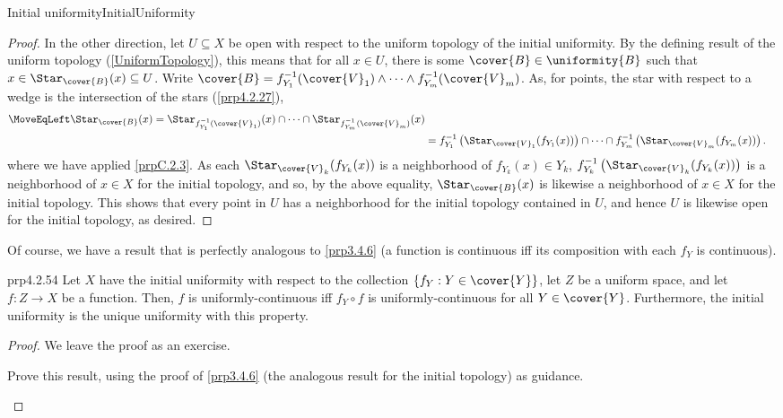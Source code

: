 \begin{prp}{Initial uniformity}{InitialUniformity}
\begin{proof}
In the other direction, let $U\subseteq X$ be open with respect to the uniform topology of the initial uniformity.  By the defining result of the uniform topology (\cref{UniformTopology}), this means that for all $x\in U$, there is some $\cover{B}\in \uniformity{B}$ such that $x\in \Star _{\cover{B}}(x)\subseteq U$.  Write $\cover{B}=f_{Y_1}^{-1}(\cover{V}_1)\wedge \cdots \wedge f_{Y_m}^{-1}(\cover{V}_m)$.  As, for points, the star with respect to a wedge is the intersection of the stars (\cref{prp4.2.27}),
{\small
\begin{equation*}
\begin{split}
\MoveEqLeft
\Star _{\cover{B}}(x)=\Star _{f_{Y_1}^{-1}(\cover{V}_1)}(x)\cap \cdots \cap \Star _{f_{Y_m}^{-1}(\cover{V}_m)}(x) \\
& =f_{Y_1}^{-1}\left( \Star _{\cover{V}_1}(f_{Y_1}(x))\right) \cap \cdots \cap f_{Y_m}^{-1}\left( \Star _{\cover{V}_m}(f_{Y_m}(x))\right) .
\end{split}
\end{equation*}
}
where we have applied \cref{prpC.2.3}.  As each $\Star _{\cover{V}_k}(f_{Y_k}(x))$ is a neighborhood of $f_{Y_k}(x)\in Y_k$, $f_{Y_k}^{-1}\left( \Star _{\cover{V}_k}(f_{Y_k}(x))\right)$ is a neighborhood of $x\in X$ for the initial topology, and so, by the above equality, $\Star _{\cover{B}}(x)$ is likewise a neighborhood of $x\in X$ for the initial topology.  This shows that every point in $U$ has a neighborhood for the initial topology contained in $U$, and hence $U$ is likewise open for the initial topology, as desired.
\end{proof}
\end{prp}
Of course, we have a result that is perfectly analogous to \cref{prp3.4.6} (a function is continuous iff its composition with each $f_Y$ is continuous).
\begin{prp}{}{prp4.2.54}
Let $X$ have the initial uniformity with respect to the collection $\{ f_Y:Y\in \cover{Y}\}$, let $Z$ be a uniform space, and let $f\colon Z\rightarrow X$ be a function.  Then, $f$ is uniformly-continuous iff $f_Y\circ f$ is uniformly-continuous for all $Y\in \cover{Y}$.  Furthermore, the initial uniformity is the unique uniformity with this property.
\begin{proof}
We leave the proof as an exercise.
\begin{exr}{}{}
Prove this result, using the proof of \cref{prp3.4.6} (the analogous result for the initial topology) as guidance.
\end{exr}
\end{proof}
\end{prp}
